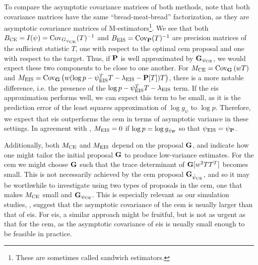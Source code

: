 To compare the asymptotic covariance matrices of both methods, note that both covariance matrices have the same ``{}bread-meat-bread''{} factorization, as they are asymptotic covariance matrices of M-estimators\footnote{These are sometimes called sandwich estimators.}. We see that both $B_{\ce} = I(\psi) = \cov_{G_{\pce}}(T)^{-1}$ and $B_{\eis} = \cov_{\P}(T)^{-1}$ are precision matrices of the sufficient statistic $T$, one with respect to the optimal \acrshort{cem} proposal and one with respect to the target. Thus, if $\P$ is well approximated by $\G_{\pce}$, we would expect these two components to be close to one another. 
For $M_{\ce} = \cov_{\G} \left( w T \right)$ and $M_{\eis} = \cov_{\G}\left( w (\log p - \psi_{\eis}^{T}T - \lambda_{\eis} - \P [T])T \right)$, there is a more notable difference, i.e. the presence of the $\log p - \psi_{\eis}^TT-\lambda_{\eis}$ term. If the \acrshort{eis} approximation performs well, we can expect this term to be small, as it is the prediction error of the least squares approximation of $\log g_{\psi}$ to $\log p$. Therefore, we expect that \acrshort{eis} outperforms the \acrshort{cem} in terms of asymptotic variance in these settings. In agreement with , $M_{\eis} = 0$ if $\log p = \log g_{\psi_{\P}}$ so that $\peis = \psi_{\P}$.

Additionally, both $M_{\ce}$ and $M_{\eis}$ depend on the proposal $\G$, and indicate how one might tailor the initial proposal $\G$ to produce low-variance estimates. For the \acrshort{cem} we might choose $\G$ such that the trace determinant of $\G [w^{2} TT^{T}]$ becomes small. This is not necessarily achieved by the \acrshort{cem} proposal $\G_{\hpce}$, and so it may be worthwhile to investigate using two types of proposals in the \acrshort{cem}, one that makes $M_{\ce}$ small and $\G_{\pce}$. This is especially relevant as our simulation studies, , suggest that the asymptotic covariance of the \acrshort{cem} is usually larger than that of \acrshort{eis}. For \acrshort{eis}, a similar approach might be fruitful, but is not as urgent as that for the \acrshort{cem}, as the asymptotic covariance of \acrshort{eis} is usually small enough to be feasible in practice.

